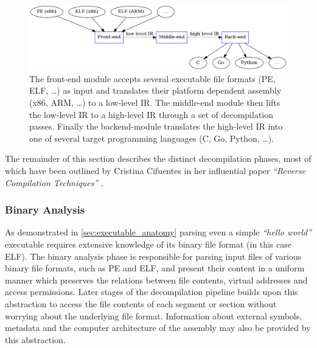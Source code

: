 \begin{figure}[htbp]
	\begin{center}
		\includegraphics[width=\textwidth]{inc/modules_overview.png}
		\caption{The front-end module accepts several executable file formats (PE, ELF, …) as input and translates their platform dependent assembly (x86, ARM, …) to a low-level IR. The middle-end module then lifts the low-level IR to a high-level IR through a set of decompilation passes. Finally the backend-module translates the high-level IR into one of several target programming languages (C, Go, Python, …).}
		\label{fig:modules_overview}
	\end{center}
\end{figure}

The remainder of this section describes the distinct decompilation phases, most of which have been outlined by Cristina Cifuentes in her influential paper \textit{``Reverse Compilation Techniques''} \cite{rev_comp}.


\subsubsection{Binary Analysis}
\label{sec:binary_analysis}

As demonstrated in \cref{sec:executable_anatomy} parsing even a simple \textit{``hello world''} executable requires extensive knowledge of its binary file format (in this case ELF). The binary analysis phase is responsible for parsing input files of various binary file formats, such as PE and ELF, and present their content in a uniform manner which preserves the relations between file contents, virtual addresses and access permissions. Later stages of the decompilation pipeline builds upon this abstraction to access the file contents of each segment or section without worrying about the underlying file format. Information about external symbols, metadata and the computer architecture of the assembly may also be provided by this abstraction.


